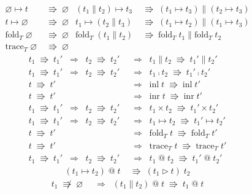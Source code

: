 \documentclass{jsarticle}
\newcommand{\reduct}[2]{#1 &\;\Rrightarrow\; #2}
\newcommand{\reduction}[2]{#1 \;\Rrightarrow\; #2}
\newcommand{\nreduction}[2]{#1 \;\not\Rrightarrow\; #2}
\begin{document}
\begin{figure}[H]
\begin{align*}
    \reduct{\varnothing\mapsto{}t}{\varnothing} &
    \reduct{(t_1\parallel{}t_2)\mapsto{}t_3}{(t_1\mapsto{}t_3)\parallel(t_2\mapsto{}t_3)} \\
    \reduct{t\mapsto\varnothing}{\varnothing} &
    \reduct{t_1\mapsto(t_2\parallel{}t_3)}{(t_1\mapsto{}t_2)\parallel(t_1\mapsto{}t_3)} \\
    \reduct{\text{fold}_T\;\varnothing}{\varnothing} &
    \reduct{\text{fold}_T\;(t_1\parallel{}t_2)}{\text{fold}_T\;t_1\parallel\text{fold}_T\;t_2} \\
    \reduct{\text{trace}_T\;\varnothing}{\varnothing}
  \end{align*}
  \begin{align*}
    \reduction{t_1}{t_1'} \;\;\Longrightarrow\;\; \reduction{t_2}{t_2'} &\;\;\Longrightarrow\;\; \reduction{t_1\parallel{}t_2}{t_1'\parallel{}t_2'} \\
    \reduction{t_1}{t_1'} \;\;\Longrightarrow\;\; \reduction{t_2}{t_2'} &\;\;\Longrightarrow\;\; \reduction{t_1\fcmp{}t_2}{t_1'\fcmp{}t_2'} \\
    \reduction{t}{t'} &\;\;\Longrightarrow\;\; \reduction{\text{inl}\;t}{\text{inl}\;t'} \\
    \reduction{t}{t'} &\;\;\Longrightarrow\;\; \reduction{\text{inr}\;t}{\text{inr}\;t'} \\
    \reduction{t_1}{t_1'} \;\;\Longrightarrow\;\; \reduction{t_2}{t_2'} &\;\;\Longrightarrow\;\; \reduction{t_1\times{}t_2}{t_1'\times{}t_2'} \\
    \reduction{t_1}{t_1'} \;\;\Longrightarrow\;\; \reduction{t_2}{t_2'} &\;\;\Longrightarrow\;\; \reduction{t_1\mapsto{}t_2}{t_1'\mapsto{}t_2'} \\
    \reduction{t}{t'} &\;\;\Longrightarrow\;\; \reduction{\text{fold}_T\;t}{\text{fold}_T\;t'} \\
    \reduction{t}{t'} &\;\;\Longrightarrow\;\; \reduction{\text{trace}_T\;t}{\text{trace}_T\;t'} \\
    \reduction{t_1}{t_1'} \;\;\Longrightarrow\;\; \reduction{t_2}{t_2'} &\;\;\Longrightarrow\;\; \reduction{t_1\;\text{@}\;t_2}{t_1'\;\text{@}\;t_2'}
  \end{align*}
  \begin{align*}
    \reduct{(t_1\mapsto{}t_2)\;\text{@}\;t}{(t_1\triangleright{}t)\;t_2}
  \end{align*}
  \begin{align*}
    \nreduction{t_1}{\varnothing} &\;\;\Longrightarrow\;\; \reduction{(t_1\parallel{}t_2)\;\text{@}\;t}{t_1\;\text{@}\;t} \\

\end{align*}
\end{figure}
\end{document}
